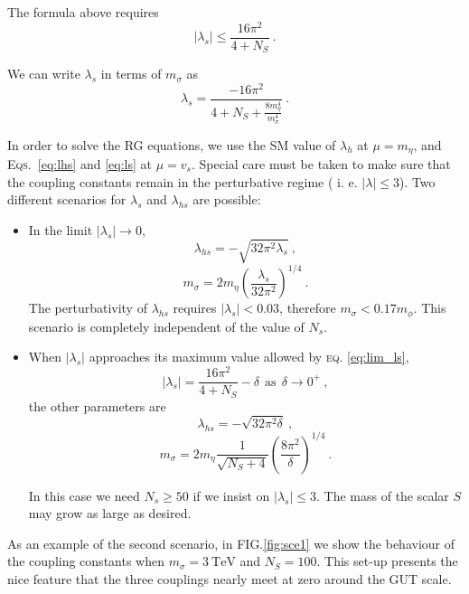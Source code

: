 \documentclass[aps,prd,preprintnumbers,nofootinbibn,twocolumn]{revtex4}
\begin{document}
The formula above requires 
\begin{equation}
|\lambda_s| \leq \frac{16\pi^2}{4+N_S}\ . \label{eq:lim_ls}
\end{equation}

We can write $\lambda_s$ in terms of $m_\sigma$ as
\begin{equation}\label{eq:ls}
\lambda_s = \frac{-16\pi^2}{4+N_S+\frac{8m_\eta^4}{m_\sigma^4}}\ .
\end{equation}


In order to solve the RG equations, we use the SM value of $\lambda_h$ at $\mu = m_\eta$, and \textsc{Eqs.}\ \eqref{eq:lhs} and \eqref{eq:ls} at $\mu=v_s$. Special care must be taken to make sure that the coupling constants remain in the perturbative regime ( i. e. $|\lambda| \leq 3$). Two different scenarios for $\lambda_s$ and $\lambda_{hs}$ are possible:
\begin{itemize}
\item In the limit $|\lambda_s|\to 0$,
\begin{equation}
\lambda_{hs} = -\sqrt{32\pi^2 \lambda_s}\ ,
\end{equation}
\begin{equation}
m_\sigma = 2 m_\eta \left(\frac{\lambda_s}{32\pi^2}\right)^{1/4}\ .
\end{equation}
The perturbativity of $\lambda_{hs}$ requires $|\lambda_s| < 0.03$, therefore $m_\sigma < 0.17 m_\phi$. This scenario is completely independent of the value of $N_s$.

\item When $|\lambda_s|$ approaches its maximum value allowed by \textsc{eq.} \eqref{eq:lim_ls},
\begin{equation}
|\lambda_s| = \frac{16\pi^2}{4+N_S} - \delta \ \ \mathrm{as}\ \ \delta\to 0^+\ ,
\end{equation}
the other parameters are
\begin{equation}
\lambda_{hs} = -\sqrt{32\pi^2 \delta}\ ,
\end{equation}
\begin{equation}
m_\sigma = 2 m_\eta \frac{1}{\sqrt{N_S + 4 }}\left(\frac{8\pi^2}{\delta}\right)^{1/4}\ .
\end{equation}

In this case we need $N_s \geq 50$ if we insist on $|\lambda_s| \leq 3$. The mass of the scalar $S$ may grow as large as desired.
\end{itemize}

As an example of the second scenario, in \textsc{FIG.}\ref{fig:sce1} we show the behaviour of the coupling constants when $m_\sigma = \SI{3}{\tera\electronvolt}$ and $N_S = 100$. This set-up presents the nice feature that the three couplings nearly meet at zero around the GUT scale. 
\end{document}
